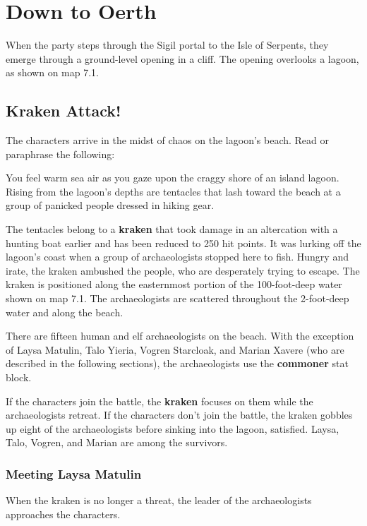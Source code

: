 \documentclass[10pt,a4paper,twoside,bg=print,twocolumn,openany,nodeprecatedcode]{dndbook}
\begin{document}
\section{Down to Oerth}
When the party steps through the Sigil portal to the Isle of Serpents, they emerge through a ground-level opening in a cliff. The opening overlooks a lagoon, as shown on map 7.1.

\subsection{Kraken Attack!}
The characters arrive in the midst of chaos on the lagoon's beach. Read or paraphrase the following:

\begin{DndReadAloud}{}
You feel warm sea air as you gaze upon the craggy shore of an island lagoon. Rising from the lagoon's depths are tentacles that lash toward the beach at a group of panicked people dressed in hiking gear.

\end{DndReadAloud}

The tentacles belong to a \textbf{kraken} that took damage in an altercation with a hunting boat earlier and has been reduced to 250 hit points. It was lurking off the lagoon's coast when a group of archaeologists stopped here to fish. Hungry and irate, the kraken ambushed the people, who are desperately trying to escape. The kraken is positioned along the easternmost portion of the 100-foot-deep water shown on map 7.1. The archaeologists are scattered throughout the 2-foot-deep water and along the beach.

There are fifteen human and elf archaeologists on the beach. With the exception of Laysa Matulin, Talo Yieria, Vogren Starcloak, and Marian Xavere (who are described in the following sections), the archaeologists use the \textbf{commoner} stat block.

If the characters join the battle, the \textbf{kraken} focuses on them while the archaeologists retreat. If the characters don't join the battle, the kraken gobbles up eight of the archaeologists before sinking into the lagoon, satisfied. Laysa, Talo, Vogren, and Marian are among the survivors.

\subsubsection{Meeting Laysa Matulin}
When the kraken is no longer a threat, the leader of the archaeologists approaches the characters.
\end{document}

